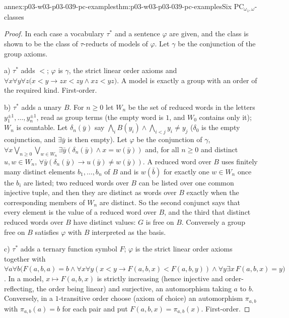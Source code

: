 \begin{annexitem}{annex:p03-w03-p03-039-pc-examples}{thm:p03-w03-p03-039-pc-examples}{Six \(\mathrm{PC}_{\omega_1,\omega}\)-classes}
\begin{proof}
In each case a vocabulary \(\tau^*\) and a sentence \(\varphi\) are given, and
the class is shown to be the class of \(\tau\)-reducts of models of
\(\varphi\). Let \(\gamma\) be the conjunction of the group axioms.

a) \(\tau^*\) adds \(<\); \(\varphi\) is \(\gamma\), the strict linear order
axioms and \(\forall x\forall y\forall z\bigl(x<y\to zx<zy\wedge xz<yz\bigr)\).
A model is exactly a group with an order of the required kind. First-order.

b) \(\tau^*\) adds a unary \(B\). For \(n\ge0\) let \(W_n\) be the set of
reduced words in the letters \(y_1^{\pm1},\dots,y_n^{\pm1}\), read as group
terms (the empty word is \(1\), and \(W_0\) contains only it); \(W_n\) is
countable. Let \(\delta_n(\bar y)\) say
\(\bigwedge_{i}B(y_i)\wedge\bigwedge_{i<j}y_i\ne y_j\) (\(\delta_0\) is the
empty conjunction, and \(\exists\bar y\) is then empty). Let \(\varphi\) be
the conjunction of \(\gamma\),
\(\forall x\bigvee_{n\ge0}\bigvee_{w\in W_n}\exists\bar y(\delta_n(\bar y)\wedge x=w(\bar y))\)
and, for all \(n\ge0\) and distinct \(u,w\in W_n\),
\(\forall\bar y(\delta_n(\bar y)\to u(\bar y)\ne w(\bar y))\). A reduced word
over \(B\) uses finitely many distinct elements \(b_1,\dots,b_n\) of \(B\) and
is \(w(\bar b)\) for exactly one \(w\in W_n\) once the \(b_i\) are listed;
two reduced words over \(B\) can be listed over one common injective tuple,
and then they are distinct as words over \(B\) exactly when the
corresponding members of \(W_n\) are distinct. So the second conjunct says
that every element is the value of a reduced word over \(B\), and the third
that distinct reduced words over \(B\) have distinct values: \(G\) is free on
\(B\). Conversely a group free on \(B\) satisfies \(\varphi\) with
\(B\) interpreted as the basis.

c) \(\tau^*\) adds a ternary function symbol \(F\); \(\varphi\) is the strict
linear order axioms together with
\(\forall a\forall b\bigl(F(a,b,a)=b\wedge\forall x\forall y(x<y\to F(a,b,x)<F(a,b,y))\wedge\forall y\exists x\,F(a,b,x)=y\bigr)\).
In a model, \(x\mapsto F(a,b,x)\) is strictly increasing (hence injective
and order-reflecting, the order being linear) and surjective, an automorphism
taking \(a\) to \(b\). Conversely, in a \(1\)-transitive order choose (axiom
of choice) an automorphism \(\pi_{a,b}\) with \(\pi_{a,b}(a)=b\) for each pair
and put \(F(a,b,x)=\pi_{a,b}(x)\). First-order.


\end{proof}
\end{annexitem}

